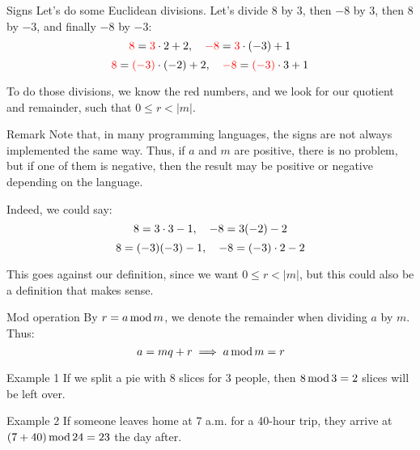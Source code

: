 \documentclass[a4paper]{article}
\begin{document}
\begin{parag}{Signs}
    Let's do some Euclidean divisions. Let's divide 8 by 3, then $-8$ by 3, then $8$ by $-3$, and finally $-8$ by $-3$:
    \[{\color{red}8} = {\color{red}3} \cdot 2 + 2, \mathspace {\color{red}-8} = {\color{red}3} \cdot \left(-3\right) + 1\]
    \[{\color{red}8} = {\color{red}\left(-3\right)} \cdot \left(-2\right) + 2, \mathspace {\color{red}-8} = {\color{red}\left(-3\right)} \cdot 3 + 1\]
    
    To do those divisions, we know the red numbers, and we look for our quotient and remainder, such that $0 \leq r < \left|m\right|$.

    \begin{subparag}{Remark}
        Note that, in many programming languages, the signs are not always implemented the same way. Thus, if $a$ and $m$ are positive, there is no problem, but if one of them is negative, then the result may be positive or negative depending on the language.

        Indeed, we could say: 
        \[8 = 3\cdot 3 - 1, \mathspace -8 = 3\left(-2\right) - 2\]
        \[8 = \left(-3\right)\left(-3\right) - 1, \mathspace -8 = \left(-3\right)\cdot 2 - 2\]

        This goes against our definition, since we want $0 \leq r < \left|m\right|$, but this could also be a definition that makes sense.
    \end{subparag}
\end{parag}

\begin{parag}{Mod operation}
    By $r = a \operatorname{mod} m$, we denote the remainder when dividing $a$ by $m$. Thus: 
    \[a = mq + r \implies a \operatorname{mod} m = r\]
\end{parag}

\begin{parag}{Example 1}
    If we split a pie with 8 slices for 3 people, then $8 \operatorname{mod} 3 = 2$ slices will be left over.
\end{parag}

\begin{parag}{Example 2}
    If someone leaves home at 7 a.m. for a 40-hour trip, they arrive at $\left(7 + 40\right) \Mod 24 = 23$ the day after.
\end{parag}
\end{document}

